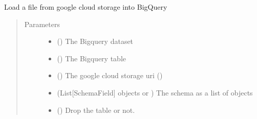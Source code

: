\documentclass[letterpaper,10pt,english]{sphinxmanual}
\begin{document}
\begin{fulllineitems}
\label{\detokenize{omicidx.bigquery_utils:omicidx.bigquery_utils.load_csv_to_bigquery}}
Load a file from google cloud storage into BigQuery
\begin{quote}\begin{description}
\item[{Parameters}] \leavevmode\begin{itemize}
\item {} 
 () \textendash{} The Bigquery dataset

\item {} 
 () \textendash{} The Bigquery table

\item {} 
 () \textendash{} The google cloud storage uri ()

\item {} 
 (List{[}SchemaField{]} objects or ) \textendash{} The schema as a list of  objects

\item {} 
 () \textendash{} Drop the table or not.

\end{itemize}

\end{description}\end{quote}

\end{fulllineitems}

\end{document}
